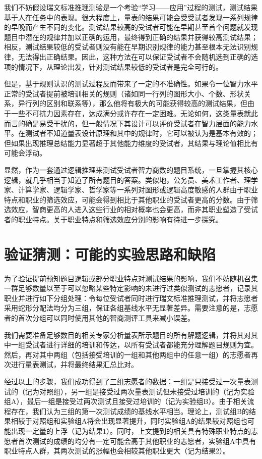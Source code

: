 \documentclass[12pt,a4paper]{article}
\begin{document}
	我们不妨假设瑞文标准推理测验是一个考验“学习——应用”过程的测试，测试结果基于人在任务中的表现。很大程度上，量表的结果可能会受受试者发现一系列规律的早晚而产生不同的变化。测试结果较高的受试者可能在早期甚至首个问题就发现题目中潜在的规律并加以正确的运用，最终得到正确的结果并获得较高测试结果；相反，测试结果较低的受试者则没有能在早期识别规律的能力甚至根本无法识别规律，无法得出正确结果。因此，这种方法在可以保证受试者不会随机选到正确的选项的情况下，从理论出发，针对测试结果较低的受试者是完全可行的。
    
    但是，基于规则认识的测试过程反而带来了一定的不准确性。如果令一位智力水平正常的受试者提前被培训相关的规则（诸如同一行列的图形大小、个数、形状关系，异行列的区别和联系等），那么他将有极大的可能获得较高的测试结果，但由于一些不可抗力因素存在，达成满分或许存在一定困难。无论如何，这类量表就此而言的确是易受干扰的，但一般情况下其设计可以评价受试者在智力层面的能力水平。在测试者不知道量表设计原理和其中的规律时，它可以被认为是基本有效的；但如果出现推理总结能力显著超于其他能力维度的受试者，其结果与理论值相比有可能会浮动。

	显然，作为一套通过逻辑推理来测试受试者智力商数的题目系统，一旦掌握其核心逻辑，就几乎相当于知道了所有题目的答案。类似地，公务员、美术工作者、理学家、计算学家、逻辑学家、哲学家等一系列对图形或逻辑高度敏感的人群由于职业特点和职业的筛选效应，可能会得到相比于其他职业的受试者更高的分数。由于筛选效应，智商更高的人进入这些行业的相对概率也会更高，而非其职业塑造了受试者的职业特点。关于职业特点和筛选效应分别的影响有待进一步探究。
    
\section{验证猜测：可能的实验思路和缺陷}

	为了验证提前预知题目逻辑或部分职业特点对测试结果的影响，我们不妨随机召集一群足够数量以至于可以忽略某些特定影响的未进行过类似测试的志愿者，记录其职业并进行如下分组处理：令每位受试者同时进行瑞文标准推理测试，并将志愿者采用蛇形分配法均分为三组，保证各组基线水平无显著差异。需要注意的是，志愿者的首次分组可以同时使用其他的智商测评工具来减小误差。

    我们需要准备足够数目的相关专家分析量表所示题目的所有解题逻辑，并将其对其中一组受试者进行详细的培训和传达，以所有受试者都能充分理解题目规则为宜。然后，再对其中两组（包括接受培训的一组和其他两组中的任意一组）的志愿者再次进行量表测试，并将最终结果汇总比对。

    经过以上的步骤，我们成功得到了三组志愿者的数据：一组是只接受过一次量表测试的（记为对照组），另一组是接受过两次量表测试但未接受过培训的（记为实验组A），最后一组是接受过两次测试且接受过培训的（记为实验组B）。由于相关流程存在，我们认为三组的第一次测试成绩的基线水平相当。理论上，测试组B的结果相较于对照组和实验组A将会出现显著提升，同时实验组A的结果较对照组也可能出现一定量的上浮（记为结果1）。同时，上文提到的相关具有特殊职业特点的志愿者首次测试的成绩的均分有一定可能会高于其他职业的志愿者，实验组A中具有职业特点人群，其两次测试的涨幅也会相较其他职业更大（记为结果2）。
\end{document}
